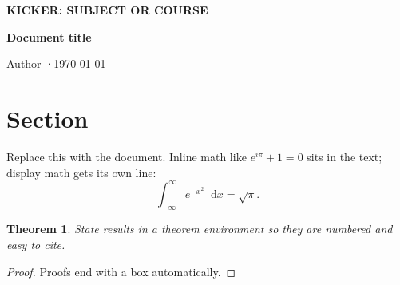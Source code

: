\documentclass[11pt]{article}
\theoremstyle{seneca}
\newtheorem{theorem}{Theorem}
\newcommand{\dd}{\mathop{}\!\mathrm{d}}
\newcommand{\kicker}[1]{{\sffamily\footnotesize\bfseries\color{steel}\MakeUppercase{#1}}}
\begin{document}
\kicker{Kicker: subject or course}\par
{\sffamily\bfseries\fontsize{24}{28}\selectfont Document title\par}
\vspace{2pt}
{\color{steel}Author \quad·\quad \today}

\section{Section}
Replace this with the document. Inline math like $e^{i\pi} + 1 = 0$ sits in the text;
display math gets its own line:
\begin{equation}
  \int_{-\infty}^{\infty} e^{-x^2} \dd x = \sqrt{\pi}.
\end{equation}

\begin{theorem}
State results in a theorem environment so they are numbered and easy to cite.
\end{theorem}

\begin{proof}
Proofs end with a box automatically.
\end{proof}
\end{document}
